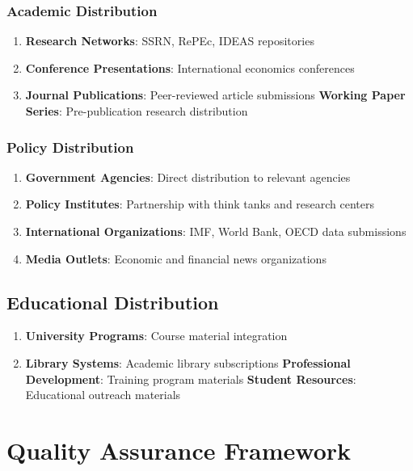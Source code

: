 \documentclass[11pt,a4paper]{article}
\begin{document}
\subsubsection{Academic Distribution}
\begin{enumerate}
    \item \textbf{Research Networks}: SSRN, RePEc, IDEAS repositories
    \item \textbf{Conference Presentations}: International economics conferences
    \item \textbf{Journal Publications}: Peer-reviewed article submissions
    \textbf{Working Paper Series}: Pre-publication research distribution
\end{enumerate}

\subsubsection{Policy Distribution}
\begin{enumerate}
    \item \textbf{Government Agencies}: Direct distribution to relevant agencies
    \item \textbf{Policy Institutes}: Partnership with think tanks and research centers
    \item \textbf{International Organizations}: IMF, World Bank, OECD data submissions
    \item \textbf{Media Outlets}: Economic and financial news organizations
\end{enumerate}

\subsection{Educational Distribution}
\begin{enumerate}
    \item \textbf{University Programs}: Course material integration
    \item \textbf{Library Systems}: Academic library subscriptions
    \textbf{Professional Development}: Training program materials
    \textbf{Student Resources}: Educational outreach materials
\end{enumerate}

\section{Quality Assurance Framework}
\end{document}
